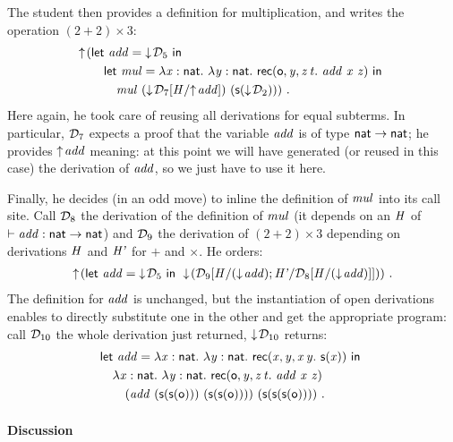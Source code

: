 \documentclass[9pt]{sigplanconf}
\begin{document}
The student then provides a definition for multiplication, and writes
the operation $(2 + 2)\times3$:
\begin{align*}
  \finfer{}(
  &\letb{add}{\fget{\md_5}}
  \\
  &\quad\letb{mul} { \tlam x {\cst{nat}} \tlam y
    {\cst{nat}} \recb \z {\var y} z t {
      \app{\var{add}}\app{\var x} {\var z}} }
  \\
  &\quad\quad\app{\var{mul}}\app
  {(\fget{\gsubst{\md_7}{\msubst H {\finfer{\var{add}}}}})}
  {(\s{\fget{\md_2}})}
  )
  \ \text{.}
\end{align*}
Here again, he took care of reusing all derivations for equal
subterms. In particular, $\md_7$ expects a proof that the variable
$\var{add}$ is of type $\cst{nat}\to\cst{nat}$; he provides
$\finfer{\var{add}}$ meaning: at this point we will have generated (or
reused in this case) the derivation of $\var{add}$, so we just have to
use it here.

Finally, he decides (in an odd move) to inline the definition of
$\var{mul}$ into its call site. Call $\md_8$ the derivation of the
definition of $\var{mul}$ (it depends on an $\var H$ of
$\vdash\var{add}:\cst{nat}\to\cst{nat}$) and $\md_9$ the derivation of
$(2+2)\times 3$ depending on derivations $\var{H}$ and $\var{H'}$ for $+$ and
$\times$. He orders:
\begin{align*}
\finfer{}(
\letb{add}{\fget{\md_5}}
\fget{({\gsubst{\md_9} {\msubst {H} {(\fget{\var{add}})}; \msubst {H'}
      {\gsubst{\md_8}{\msubst H {(\fget{\var{add}})}}}}})}
)
  \ \text{.}
\end{align*}
The definition for $\var{add}$ is unchanged, but the instantiation of
open derivations enables to directly substitute one in the other and
get the appropriate program: call $\md_{10}$ the whole derivation just
returned, $\fget{\md_{10}}$ returns:
\begin{align*}
  &\letb{add}{\tlam x {\cst{nat}} \tlam y {\cst{nat}} \recb {\var x}
    {\var y} x y {\s{\var x}}}
  \\&\quad
  {\tlam x {\cst{nat}} \tlam y
    {\cst{nat}} \recb \z {\var y} z t {
      \app{\var{add}}\app{\var x} {\var z}}}
  \\&\quad\quad
  \app{(\app {\var{add}} \app {(\s{\s\z})}
    {(\s{\s\z})})}{(\s{\s{\s\z}})}
  \ \text{.}
\end{align*}

\paragraph{Discussion}
\end{document}
